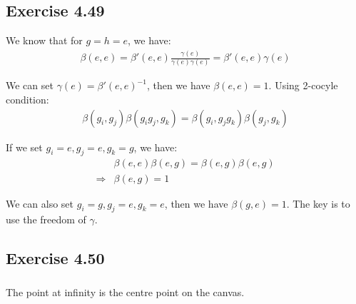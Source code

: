 \documentclass[]{ctexart}
\begin{document}
		\subsection{Exercise 4.49}
			We know that for $g=h=e$, we have:
				\begin{equation*}
				\begin{aligned}
					\beta(e,e) =\beta' (e,e)\frac{\gamma (e)}{\gamma (e)\gamma (e)}=\beta' (e,e)\gamma (e)
				\end{aligned}
				\end{equation*}
			
			We can set $\gamma (e)=\beta' (e,e)^{-1}$, then we have $\beta(e,e)=1$. Using 2-cocyle condition:
				\begin{equation*}
				\begin{aligned}
					\beta\left(g_{i}, g_{j}\right) \beta\left(g_{i} g_{j}, g_{k}\right)=\beta\left(g_{i}, g_{j} g_{k}\right) \beta\left(g_{j}, g_{k}\right)
				\end{aligned}
				\end{equation*}
			
			If we set $g_{i}=e,g_{j}=e,g_{k}=g$, we have:
				\begin{equation*}
				\begin{aligned}
					&\beta\left(e, e\right) \beta\left(e, g\right)=\beta\left(e, g\right) \beta\left(e, g\right)\\
					\Rightarrow &\beta\left(e, g\right)=1
				\end{aligned}
				\end{equation*}
			
			We can also set $g_{i}=g,g_{j}=e,g_{k}=e$, then we have $\beta\left(g, e\right)=1$. The key is to use the freedom of $\gamma$. 
		
	\subsection{Exercise 4.50}
		\subsubsection{}
			The point at infinity is the centre point on the canvas.
		
\end{document}
